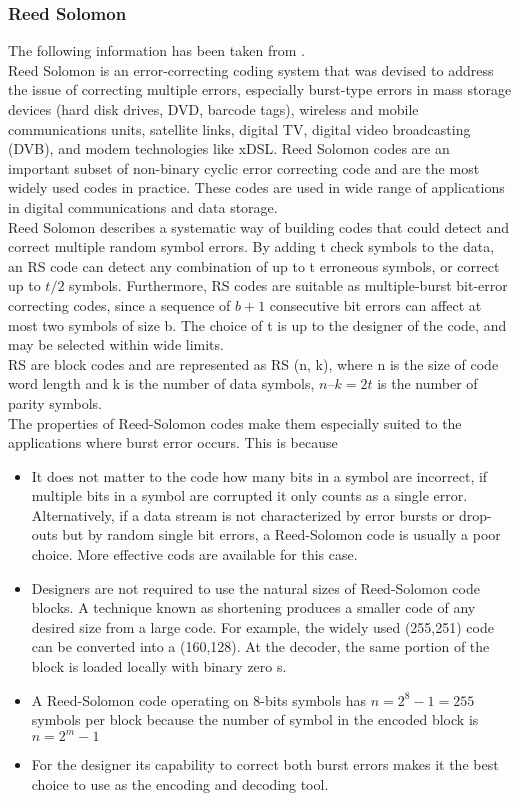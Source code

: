 \subsubsection{Reed Solomon}
The following information has been taken from \cite{ReedSolmon_ResearchPaper}.\\
Reed Solomon is an error-correcting coding system that was devised to address the issue of correcting multiple 
errors, especially burst-type errors in mass storage devices (hard disk drives, DVD, barcode tags), wireless and mobile 
communications units, satellite links, digital TV, digital video broadcasting (DVB), and modem technologies like xDSL. Reed Solomon codes are an important subset of non-binary cyclic error correcting code and are the most widely used codes in practice. These codes are  used in wide range of applications in digital communications and data  storage. \\
Reed Solomon describes a systematic  way of building codes that could detect and correct multiple random symbol errors. By adding t check symbols to the data, an RS code can detect any combination of up to t erroneous symbols, or correct up to $t/2$ symbols. Furthermore, RS codes are suitable as multiple-burst bit-error correcting codes, since a sequence of $b + 1$ consecutive bit errors can affect at most two symbols of size b. The choice of t  is up to the designer of the code, and may be selected within wide limits.\\
RS are  block codes and are  represented as RS (n, k),  where  n is the  size  of code  word length and k is the number of data symbols, $n – k = 2t$ is the number of parity symbols.\\
The properties of Reed-Solomon codes make them especially suited to the applications where burst error occurs. This is because
\begin{itemize}
    \item It does not matter to the code how many bits in a symbol are incorrect, if multiple bits in a symbol are corrupted it only counts as a single error. Alternatively, if a data stream is not characterized by error bursts or drop-outs but by random single bit errors, a Reed-Solomon code is usually a poor choice. More effective cods are available for this case.
    \item Designers are not required to use the natural sizes of Reed-Solomon code blocks. A technique known as shortening produces a smaller code of any desired size from a large code. For example, the widely used (255,251) code can be converted into a (160,128). At the decoder, the same portion of the block is loaded locally with binary zero
    s.
    \item A Reed-Solomon code operating on 8-bits symbols has $n=2^8-1 = 255$ symbols per block because the number of symbol in the encoded block is $n = 2^m-1$
    \item For the designer its capability to correct both burst errors makes it the best choice to use as the encoding and decoding tool.
\end{itemize}
%
%
